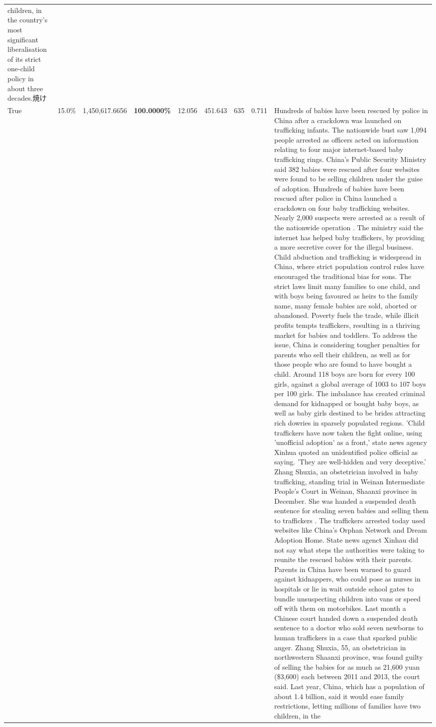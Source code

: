 \begin{table}[H]
\begin{tabular}{lllrlllll}
children, in the country's most significant liberalisation of its strict one-child policy in about three decades.焼け \\
\cline{1-9}
True & 15.0\% & 1,450,617.6656 & \bfseries \color{red} 100.0000\% & 12.056 & 451.643 & 635 & 0.711 & Hundreds of babies have been rescued by police in China after a crackdown was launched on trafficking infants. The nationwide bust saw 1,094 people arrested as officers acted on information relating to four major internet-based baby trafficking rings. China's Public Security Ministry said 382 babies were rescued after four websites were found to be selling children under the guise of adoption. Hundreds of babies have been rescued after police in China launched a crackdown on four baby trafficking websites. Nearly 2,000 suspects were arrested as a result of the nationwide operation . The ministry said the internet has helped baby traffickers, by providing a more secretive cover for the illegal business. Child abduction and trafficking is widespread in China, where strict population control rules have encouraged the traditional bias for sons. The strict laws limit many families to one child, and with boys being favoured as heirs to the family name, many female babies are sold, aborted or abandoned. Poverty fuels the trade, while illicit profits tempts traffickers, resulting in a thriving market for babies and toddlers. To address the issue, China is considering tougher penalties for parents who sell their children, as well as for those people who are found to have bought a child. Around 118 boys are born for every 100 girls, against a global average of 1003 to 107 boys per 100 girls. The imbalance has created criminal demand for kidnapped or bought baby boys, as well as baby girls destined to be brides attracting rich dowries in sparsely populated regions. 'Child traffickers have now taken the fight online, using 'unofficial adoption' as a front,' state news agency Xinhua quoted an unidentified police official as saying. 'They are well-hidden and very deceptive.' Zhang Shuxia, an obstetrician involved in baby trafficking, standing trial in Weinan Intermediate People's Court in Weinan, Shaanxi province in December. She was handed a suspended death sentence for stealing seven babies and selling them to traffickers . The traffickers arrested today used websites like China's Orphan Network and Dream Adoption Home. State news agenct Xinhau did not say what steps the authorities were taking to reunite the rescued babies with their parents. Parents in China have been warned to guard against kidnappers, who could pose as nurses in hospitals or lie in wait outside school gates to bundle unsuspecting children into vans or speed off with them on motorbikes. Last month a Chinese court handed down a suspended death sentence to a doctor who sold seven newborns to human traffickers in a case that sparked public anger. Zhang Shuxia, 55, an obstetrician in northwestern Shaanxi province, was found guilty of selling the babies for as much as 21,600 yuan (\$3,600) each between 2011 and 2013, the court said. Last year, China, which has a population of about 1.4 billion, said it would ease family restrictions, letting millions of families have two children, in the 
\end{tabular}
\end{table}
